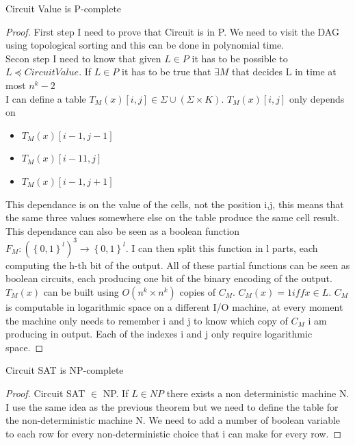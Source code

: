 \begin{theorem}
    Circuit Value is P-complete
    \begin{proof}
        First step I need to prove that Circuit is in P.  We need to visit the DAG using topological sorting and this can be done in polynomial time.\\
        Secon step I need to know that given $L\in P$ it has to be possible to $L \preceq CircuitValue$. If $L \in P$ it has to be true that $\exists M$ that decides L in time at most $n^k-2$\\ I can define a table $T_M(x)[i,j] \in \Sigma \cup (\Sigma \times K)$. $T_M(x)[i,j]$ only depends on
        \begin{itemize}
            \item $T_M(x)[i-1,j-1]$ 
            \item $T_M(x)[i-11,j]$
            \item $T_M(x)[i-1,j+1]$
        \end{itemize}This dependance is on the value of the cells, not the position i,j, this means that the same three values somewhere else on the table produce the same cell result. This dependance can also be seen as a boolean function $F_M:\left( \left\{ 0,1 \right\}^l \right)^3 \longrightarrow \left\{ 0,1 \right\}^l$. I can then split this function in l parts, each computing the h-th bit of the output. All of these partial functions can be seen as boolean circuits, each producing one bit of the binary encoding of the output.
        $T_M(x)$ can be built using $O(n^k \times n^k)$ copies of $C_M$. $C_M(x) = 1 iff x\in L$. $C_M$ is computable in logarithmic space on a different I/O machine, at every moment the machine only needs to remember i and j to know which copy of $C_M$ i am producing in output. Each of the indexes i and j only require logarithmic space.
    \end{proof}
\end{theorem}

\begin{theorem}
    Circuit SAT is NP-complete
    \begin{proof}
        Circuit SAT $\in$ NP. If $L \in NP$ there exists a non deterministic machine N. I use the same idea as the previous theorem but we need to define the table for the non-deterministic machine N. We need to add a number of boolean variable to each row for every non-deterministic choice that i can make for every row.
    \end{proof}
\end{theorem}

